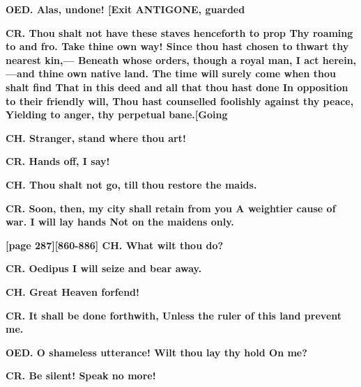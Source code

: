 \documentclass[11pt,letter]{book}
\begin{document}
\par \textbf{OED. Alas, undone! [Exit ANTIGONE, guarded}
\par 

\par \textbf{CR. Thou shalt not have these staves henceforth to prop Thy roaming to and fro. Take thine own way! Since thou hast chosen to thwart thy nearest kin,— Beneath whose orders, though a royal man, I act herein,—and thine own native land. The time will surely come when thou shalt find That in this deed and all that thou hast done In opposition to their friendly will, Thou hast counselled foolishly against thy peace, Yielding to anger, thy perpetual bane.[Going}
\par 

\par \textbf{CH. Stranger, stand where thou art!}
\par 

\par \textbf{CR. Hands off, I say!}
\par 

\par \textbf{CH. Thou shalt not go, till thou restore the maids.}
\par 

\par \textbf{CR. Soon, then, my city shall retain from you A weightier cause of war. I will lay hands Not on the maidens only.}
\par 

\par \textbf{[page 287][860-886] CH. What wilt thou do?}
\par 

\par \textbf{CR. Oedipus I will seize and bear away.}
\par 

\par \textbf{CH. Great Heaven forfend!}
\par 

\par \textbf{CR. It shall be done forthwith, Unless the ruler of this land prevent me.}
\par 

\par \textbf{OED. O shameless utterance! Wilt thou lay thy hold On me?}
\par 

\par \textbf{CR. Be silent! Speak no more!}
\par 
\end{document}
